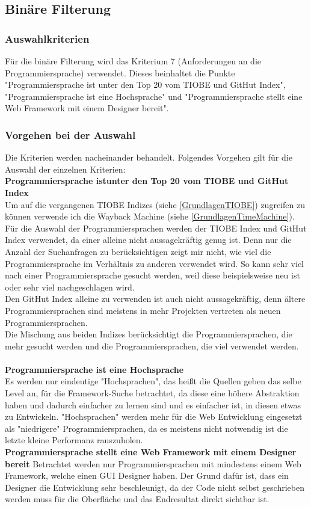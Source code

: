 \documentclass[ngerman]{article}
\begin{document}
    \subsection{Binäre Filterung}
    \subsubsection{Auswahlkriterien}
    Für die binäre Filterung wird das Kriterium 7 (Anforderungen an die Programmiersprache) verwendet. Dieses beinhaltet die Punkte "Programmiersprache ist unter den Top 20 vom TIOBE und GitHut Index", "Programmiersprache ist eine Hochsprache" und "Programmiersprache stellt eine Web Framework mit einem Designer bereit".
    \subsubsection{Vorgehen bei der Auswahl}
    Die Kriterien werden nacheinander behandelt. Folgendes Vorgehen gilt für die Auswahl der einzelnen Kriterien:\\
    \textbf{Programmiersprache istunter  den  Top  20  vom  TIOBE  und  GitHut  Index}\\
    Um auf die vergangenen TIOBE Indizes (siehe \ref{GrundlagenTIOBE}) zugreifen zu können verwende ich die Wayback Machine (siehe \ref{GrundlagenTimeMachine}).\\
    Für die Auswahl der Programmiersprachen werden der TIOBE Index und GitHut Index verwendet, da einer alleine nicht aussagekräftig genug ist. Denn nur die Anzahl der Suchanfragen zu berücksichtigen zeigt mir nicht, wie viel die Programmiersprache im Verhältnis zu anderen verwendet wird. So kann sehr viel nach einer Programmiersprache gesucht werden, weil diese beispielsweise neu ist oder sehr viel nachgeschlagen wird.\\
    Den GitHut Index alleine zu verwenden ist auch nicht aussagekräftig, denn ältere Programmiersprachen sind meistens in mehr Projekten vertreten als neuen Programmiersprachen.\\
    Die Mischung aus beiden Indizes berücksichtigt die Programmiersprachen, die mehr gesucht werden und die Programmiersprachen, die viel verwendet werden.\\\\
    \textbf{Programmiersprache ist eine Hochsprache}\\
    Es werden nur eindeutige "Hochsprachen", das heißt die Quellen geben das selbe Level an, für die Framework-Suche betrachtet, da diese eine höhere Abstraktion haben und dadurch einfacher zu lernen sind und es einfacher ist, in diesen etwas zu Entwickeln. "Hochsprachen" werden mehr für die Web Entwicklung eingesetzt als "niedrigere" Programmiersprachen, da es meistens nicht notwendig ist die letzte kleine Performanz rauszuholen. \cite{High level Low level languages}\\
    \textbf{Programmiersprache stellt eine Web Framework mit einem Designer bereit}
    Betrachtet werden nur Programmiersprachen mit mindestens einem Web Framework, welche einen GUI Designer haben. Der Grund dafür ist, dass ein Designer die Entwicklung sehr beschleunigt, da der Code nicht selbst geschrieben werden muss für die Oberfläche und das Endresultat direkt sichtbar ist.
\end{document}
